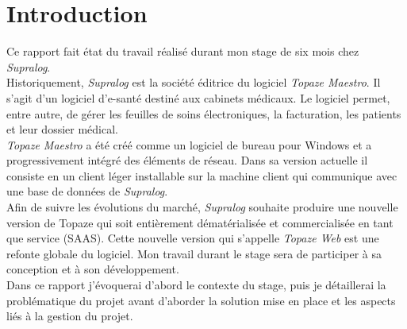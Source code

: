 \newpage
\section{Introduction} %

Ce rapport fait état du travail réalisé durant mon stage de six mois chez \textit{Supralog}.\\

Historiquement, \textit{Supralog} est la société éditrice du logiciel \textit{\gls{Topaze Maestro}}. Il s’agit d’un logiciel d’e-santé destiné aux cabinets médicaux. Le logiciel permet, entre autre, de gérer les feuilles de soins électroniques, la facturation, les patients et leur dossier médical.\\
\textit{Topaze Maestro} a été créé comme un logiciel de bureau pour Windows et a progressivement intégré des éléments de réseau. Dans sa version actuelle il consiste en un client léger installable sur la machine client qui communique avec une base de données de \textit{Supralog}.\\

Afin de suivre les évolutions du marché, \textit{Supralog} souhaite produire une nouvelle version de Topaze qui soit entièrement dématérialisée et commercialisée en tant que service (\gls{SAAS}). Cette nouvelle version qui s’appelle \textit{\gls{Topaze Web}} est une refonte globale du logiciel. Mon travail durant le stage sera de participer à sa conception et à son développement.\\

Dans ce rapport j’évoquerai d’abord le contexte du stage, puis je détaillerai la problématique du projet avant d’aborder la solution mise en place et les aspects liés à la gestion du projet. 

